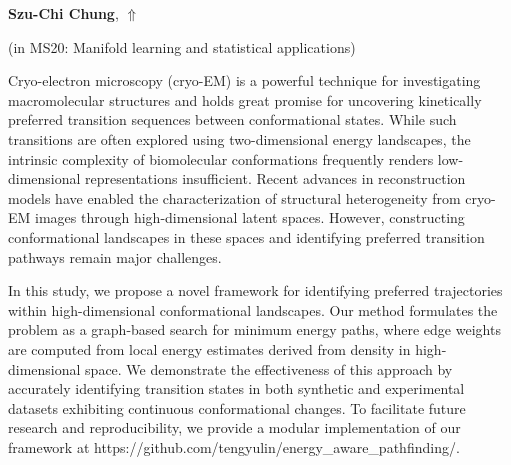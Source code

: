 \documentclass[ILAS2025-program.tex]{subfiles}
\begin{document}
\hypertarget{down0042}{}\begin{ilasabstract}
    
\textbf{Szu-Chi Chung},  \hfill \hyperlink{up0042}{$\Uparrow$}
    
    
(in {\color{mstitle}MS20: Manifold learning and statistical applications})
        
\mtskip
    Cryo-electron microscopy (cryo-EM) is a powerful technique for investigating macromolecular structures and holds great promise for uncovering kinetically preferred transition sequences between conformational states. While such transitions are often explored using two-dimensional energy landscapes, the intrinsic complexity of biomolecular conformations frequently renders low-dimensional representations insufficient. Recent advances in reconstruction models have enabled the characterization of structural heterogeneity from cryo-EM images through high-dimensional latent spaces. However, constructing conformational landscapes in these spaces and identifying preferred transition pathways remain major challenges. 

In this study, we propose a novel framework for identifying preferred trajectories within high-dimensional conformational landscapes. Our method formulates the problem as a graph-based search for minimum energy paths, where edge weights are computed from local energy estimates derived from density in high-dimensional space. We demonstrate the effectiveness of this approach by accurately identifying transition states in both synthetic and experimental datasets exhibiting continuous conformational changes. To facilitate future research and reproducibility, we provide a modular implementation of our framework at https://github.com/tengyulin/energy\_aware\_pathfinding/.

\end{ilasabstract}
    
\end{document}
